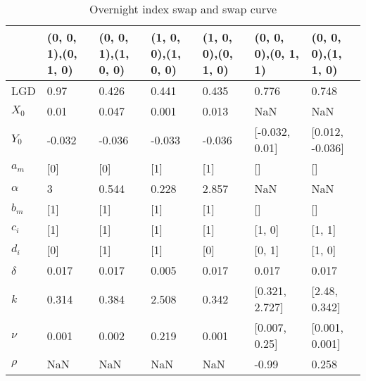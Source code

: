 \begin{table}[H]
	\centering
	\caption{Overnight index swap and swap curve}
	\label{ois_swap}
	
	\begin{adjustbox}{width=\textwidth}
		
\begin{tabular}{lllllll}
	\toprule
	{} & (0, 0, 1),(0, 1, 0) & (0, 0, 1),(1, 0, 0) & (1, 0, 0),(1, 0, 0) & (1, 0, 0),(0, 1, 0) & (0, 0, 0),(0, 1, 1) & (0, 0, 0),(1, 1, 0) \\
	\midrule
	LGD    &                0.97 &               0.426 &               0.441 &               0.435 &               0.776 &               0.748 \\
	$X_0$    &                0.01 &               0.047 &               0.001 &               0.013 &                 NaN &                 NaN \\
	$Y_0$    &              -0.032 &              -0.036 &              -0.033 &              -0.036 &      [-0.032, 0.01] &     [0.012, -0.036] \\
	$a_m$    &                 [0] &                 [0] &                 [1] &                 [1] &                  [] &                  [] \\
	$\alpha$  &                   3 &               0.544 &               0.228 &               2.857 &                 NaN &                 NaN \\
	$b_m$    &                 [1] &                 [1] &                 [1] &                 [1] &                  [] &                  [] \\
	$c_i$    &                 [1] &                 [1] &                 [1] &                 [1] &              [1, 0] &              [1, 1] \\
	$d_i$    &                 [0] &                 [1] &                 [1] &                 [0] &              [0, 1] &              [1, 0] \\
	$\delta$  &               0.017 &               0.017 &               0.005 &               0.017 &               0.017 &               0.017 \\
	$k$      &               0.314 &               0.384 &               2.508 &               0.342 &      [0.321, 2.727] &       [2.48, 0.342] \\
	$\nu$     &               0.001 &               0.002 &               0.219 &               0.001 &       [0.007, 0.25] &      [0.001, 0.001] \\
	$\rho$    &                 NaN &                 NaN &                 NaN &                 NaN &               -0.99 &               0.258 \\

\end{tabular}
\end{adjustbox}
\end{table}
